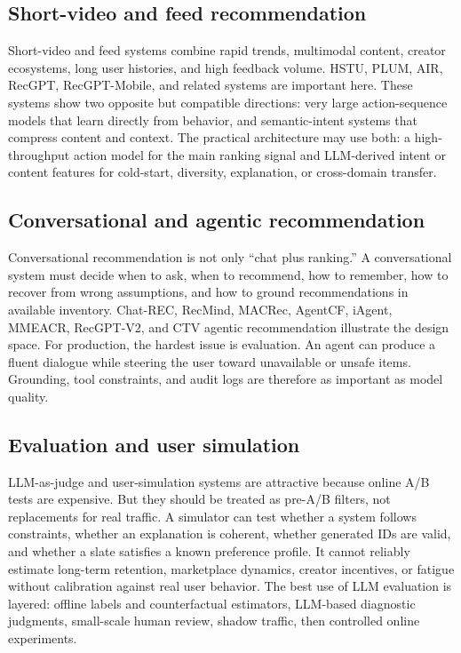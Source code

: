 \documentclass[11pt]{article}
\begin{document}
\subsection{Short-video and feed recommendation}

Short-video and feed systems combine rapid trends, multimodal content, creator ecosystems, long user histories, and high feedback volume. HSTU, PLUM, AIR, RecGPT, RecGPT-Mobile, and related systems are important here. These systems show two opposite but compatible directions: very large action-sequence models that learn directly from behavior, and semantic-intent systems that compress content and context. The practical architecture may use both: a high-throughput action model for the main ranking signal and LLM-derived intent or content features for cold-start, diversity, explanation, or cross-domain transfer.

\subsection{Conversational and agentic recommendation}

Conversational recommendation is not only ``chat plus ranking.'' A conversational system must decide when to ask, when to recommend, how to remember, how to recover from wrong assumptions, and how to ground recommendations in available inventory. Chat-REC, RecMind, MACRec, AgentCF, iAgent, MMEACR, RecGPT-V2, and CTV agentic recommendation illustrate the design space. For production, the hardest issue is evaluation. An agent can produce a fluent dialogue while steering the user toward unavailable or unsafe items. Grounding, tool constraints, and audit logs are therefore as important as model quality.

\subsection{Evaluation and user simulation}

LLM-as-judge and user-simulation systems are attractive because online A/B tests are expensive. But they should be treated as pre-A/B filters, not replacements for real traffic. A simulator can test whether a system follows constraints, whether an explanation is coherent, whether generated IDs are valid, and whether a slate satisfies a known preference profile. It cannot reliably estimate long-term retention, marketplace dynamics, creator incentives, or fatigue without calibration against real user behavior. The best use of LLM evaluation is layered: offline labels and counterfactual estimators, LLM-based diagnostic judgments, small-scale human review, shadow traffic, then controlled online experiments.
\end{document}
